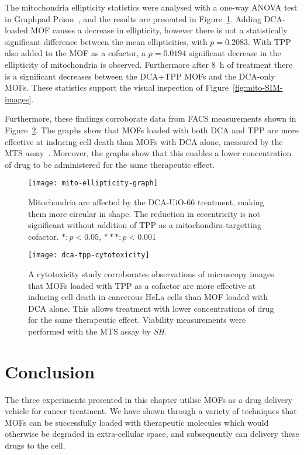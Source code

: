 The mitochondria ellipticity statistics were analysed with a one-way ANOVA test in Graphpad Prism~\cite{graphpadprism}, and the results are presented in Figure~\ref{fig:mito-ellipticity-graph}. 
Adding DCA-loaded MOF causes a decrease in ellipticity, however there is not a statistically significant difference between the mean ellipticities, with $p=0.2083$. 
With TPP also added to the MOF as a cofactor, a $p=0.0194$ significant decrease in the ellipticity of mitochondria is observed. 
Furthermore after \SI{8}{\hour} of treatment there is a significant decreases between the DCA+TPP MOFs and the DCA-only MOFs. 
These statistics support the visual inspection of Figure~\ref{fig:mito-SIM-images}. 

Furthermore, these findings corroborate data from FACS measurements shown in Figure~\ref{fig:dca-tpp-cytotoxicity}. 
The graphs show that MOFs loaded with both DCA and TPP are more effective at inducing cell death than MOFs with DCA alone, measured by the MTS assay~\cite{mosmann1983rapid, mtsassay}. 
Moreover, the graphs show that this enables a lower concentration of drug to be administered for the same therapeutic effect.

\begin{figure}[htbp!]
\centering
\texttt{[image: mito-ellipticity-graph]}
\caption[MOFs: Mitochondria become more circular when treated with ] {Mitochondria are affected by the DCA-UiO-66 treatment, making them more circular in shape. The reduction in eccentricity is not significant without addition of TPP as a mitochondira-targetting cofactor. $*: p<0.05$, $***: p<0.001$} 
\label{fig:mito-ellipticity-graph}
\end{figure}

\begin{figure}[htbp!]
\centering
\texttt{[image: dca-tpp-cytotoxicity]}
\caption[MOFs: Loading MOFs with TPP as a cofactor facilitates lower drug concentration] {A cytotoxicity study corroborates observations of microscopy images that MOFs loaded with TPP as a cofactor are more effective at inducing cell death in cancerous HeLa cells than MOF loaded with DCA alone. This allows treatment with lower concentrations of drug for the same therapeutic effect. Viability measurements were performed with the MTS assay by \textit{SH}. } 
\label{fig:dca-tpp-cytotoxicity}
\end{figure}


\section{Conclusion} \label{sec:mof-conclusion}
The three experiments presented in this chapter utilise MOFs as a drug delivery vehicle for cancer treatment. 
We have shown through a variety of techniques that MOFs can be successfully loaded with therapeutic molecules which would otherwise be degraded in extra-cellular space, and subsequently can delivery these drugs to the cell. 


